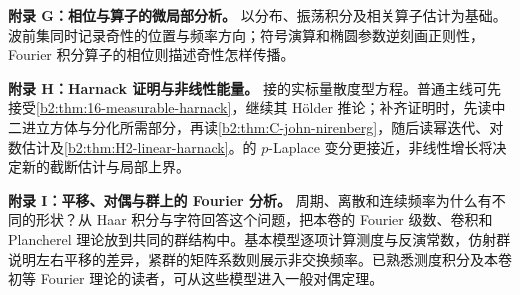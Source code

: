 \ProseParagraphBreak
\noindent\textbf{附录 G：相位与算子的微局部分析。}
以分布、振荡积分及相关算子估计为基础。波前集同时记录奇性的位置与频率方向；符号演算和椭圆参数逆刻画正则性，Fourier 积分算子的相位则描述奇性怎样传播。

\ProseParagraphBreak
\noindent\textbf{附录 H：Harnack 证明与非线性能量。}
接的实标量散度型方程。普通主线可先接受\cref{b2:thm:16-measurable-harnack}，继续其 Hölder 推论；补齐证明时，先读中二进立方体与分化所需部分，再读\cref{b2:thm:C-john-nirenberg}，随后读幂迭代、对数估计及\cref{b2:thm:H2-linear-harnack}。的 \(p\)-Laplace 变分更接近，非线性增长将决定新的截断估计与局部上界。

\ProseParagraphBreak
\noindent\textbf{附录 I：平移、对偶与群上的 Fourier 分析。}
周期、离散和连续频率为什么有不同的形状？从 Haar 积分与字符回答这个问题，把本卷的 Fourier 级数、卷积和 Plancherel 理论放到共同的群结构中。基本模型逐项计算测度与反演常数，仿射群说明左右平移的差异，紧群的矩阵系数则展示非交换频率。已熟悉测度积分及本卷初等 Fourier 理论的读者，可从这些模型进入一般对偶定理。
